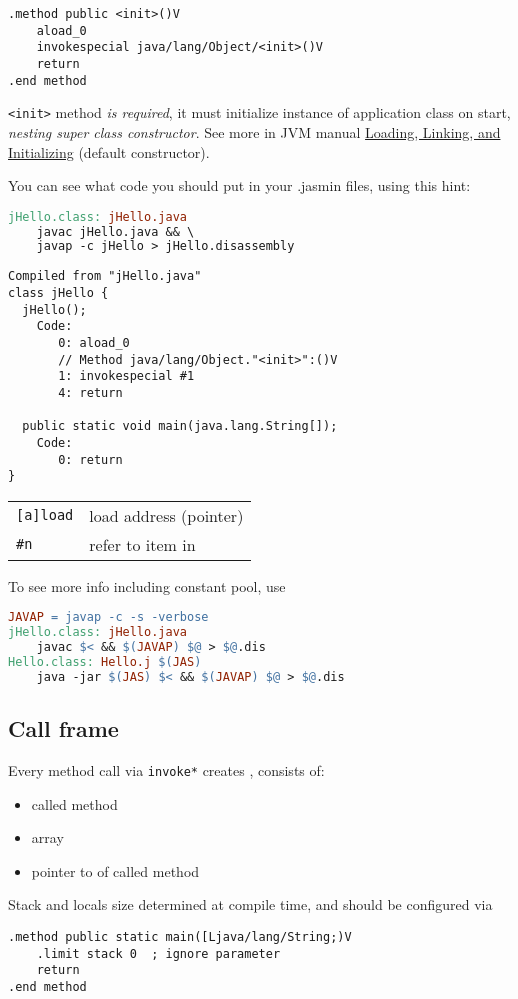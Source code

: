 \begin{lstlisting}
.method public <init>()V
	aload_0
	invokespecial java/lang/Object/<init>()V
	return
.end method
\end{lstlisting}
\verb|<init>|  method \emph{is required}, it must initialize
instance of application class on start, \emph{nesting super class constructor}.
See more in JVM manual
\href{https://docs.oracle.com/javase/specs/jvms/se7/html/jvms-5.html}{Loading, Linking, and Initializing}
(default constructor).

\medskip
You can see what code you should put in your .jasmin files, using this hint:
\begin{lstlisting}[language=make,title=java/Makefile]
jHello.class: jHello.java
	javac jHello.java && \
	javap -c jHello > jHello.disassembly
\end{lstlisting}

\begin{lstlisting}[title=java/jHello.disassembly]
Compiled from "jHello.java"
class jHello {
  jHello();
    Code:
       0: aload_0
       // Method java/lang/Object."<init>":()V
       1: invokespecial #1                  
       4: return

  public static void main(java.lang.String[]);
    Code:
       0: return
}
\end{lstlisting}

\begin{tabular}{l l}
\verb|[a]load| & load address (pointer) \\
\verb|#n| & refer to item in \term{constants pool}\\
\end{tabular}

\medskip\noindent
To see more info including constant pool, use
\begin{lstlisting}[language=make,title=java/Makefile]
JAVAP = javap -c -s -verbose
jHello.class: jHello.java
	javac $< && $(JAVAP) $@ > $@.dis
Hello.class: Hello.j $(JAS)
	java -jar $(JAS) $< && $(JAVAP) $@ > $@.dis
\end{lstlisting}


% 

\subsection{Call frame}

Every method call via \verb|invoke*| creates , consists of:
\begin{itemize}[nosep]
  \item called method 
  \item {} array
  \item pointer to  of called method 
\end{itemize}
Stack and locals size determined at compile time, and should be configured via
\begin{lstlisting}[title=java/Hello.j]
.method public static main([Ljava/lang/String;)V
	.limit stack 0	; ignore parameter
	return
.end method
\end{lstlisting}
